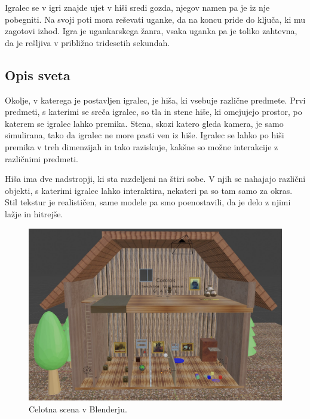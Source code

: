 \documentclass[a4paper,12pt]{article}
\begin{document}
Igralec se v igri znajde ujet v hiši sredi gozda, njegov namen pa je iz nje pobegniti. Na svoji poti mora reševati uganke, da na koncu pride do ključa, ki mu zagotovi izhod. Igra je ugankarskega žanra, vsaka uganka pa je toliko zahtevna, da je rešljiva v približno tridesetih sekundah.

\subsection{Opis sveta}
Okolje, v katerega je postavljen igralec, je hiša, ki vsebuje različne predmete. Prvi predmeti, s katerimi se sreča igralec, so tla in stene hiše, ki omejujejo prostor, po katerem se igralec lahko premika. Stena, skozi katero gleda kamera, je samo simulirana, tako da igralec ne more pasti ven iz hiše. Igralec se lahko po hiši premika v treh dimenzijah in tako raziskuje, kakšne so možne interakcije z različnimi predmeti.

Hiša ima dve nadstropji, ki sta razdeljeni na štiri sobe. V njih se nahajajo različni objekti, s katerimi igralec lahko interaktira, nekateri pa so tam samo za okras. Stil tekstur je realističen, same modele pa smo poenostavili, da je delo z njimi lažje in hitrejše.

\begin{figure}[!htb]
    \begin{center}
        \includegraphics[width=0.95\columnwidth]{svet.jpg}
        \caption{Celotna scena v Blenderju.}
    \end{center}
\end{figure}
\end{document}

